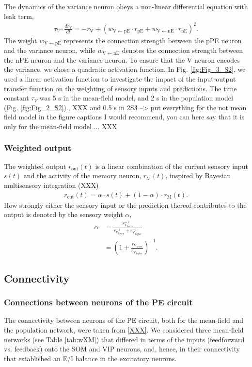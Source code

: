 \documentclass[10pt,a4paper,draft]{article}
\begin{document}
The dynamics of the variance neuron obeys a non-linear differential equation with leak term,
%
\begin{align}
\tau_V \cdot \frac{dr_\mathrm{V}}{dt} = -r_\mathrm{V} + (w_\mathrm{V\leftarrow pE} \cdot r_\mathrm{pE} + w_\mathrm{V\leftarrow nE} \cdot r_\mathrm{nE})^2.
\end{align}
%
The weight $w_\mathrm{V\leftarrow pE}$ represents the connection strength between the pPE neuron and the variance neuron, while  $w_\mathrm{V\leftarrow nE}$ denotes the connection strength between the nPE neuron and the variance neuron. To ensure that the V neuron encodes the variance, we chose a quadratic activation function. In Fig. \ref{fig:Fig_3_S2}, we used a linear activation function to investigate the impact of the input-output transfer function on the weighting of sensory inputs and predictions. The time constant $\tau_V$ was 5 s in the mean-field model, and 2 s in the population model (Fig. \ref{fig:Fig_2_S2})., XXX and 0.5 s in 2S3 --> put everything for the not mean field model in the figure captions I would recommend, you can here say that it is only for the mean-field model ... XXX

\subsubsection{Weighted output}
%
The weighted output $r_\mathrm{out}(t) $ is a linear combination of the current sensory input $s(t)$ and the activity of the memory neuron, $r_\mathrm{M}(t)$, inspired by Bayesian multisensory integration (XXX)
%
\begin{align}
r_\mathrm{out}(t) = \alpha \cdot s(t) + (1-\alpha) \cdot r_\mathrm{M}(t).
\end{align}
%
How strongly either the sensory input or the prediction thereof contributes to the output is denoted by the sensory weight $\alpha$,
%
\begin{align}
\alpha &= \frac{r_\mathrm{V_{lower}}^{-1}}{r_\mathrm{V_{lower}}^{-1} + r_\mathrm{V_{higher}}^{-1}}\nonumber\\
& = \left( 1 + \frac{r_\mathrm{V_{lower}}}{r_\mathrm{V_{higher}}} \right)^{-1}.
\end{align}

\subsection{Connectivity}
%
%
\subsubsection{Connections between neurons of the PE circuit}
%
The connectivity between neurons of the PE circuit, both for the mean-field and the population network, were taken from \ref{XXX}. We considered three mean-field networks (see Table \ref{tab:wXM}) that differed in terms of the inputs (feedforward vs. feedback) onto the SOM and VIP neurons, and, hence, in their connectivity that established an E/I balance in the excitatory neurons.
\end{document}
